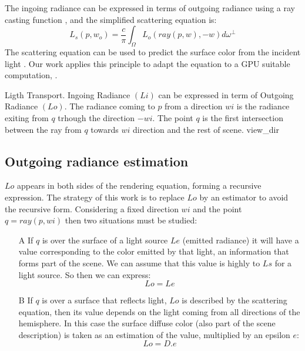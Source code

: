\documentclass[10pt, conference]{IEEEtran}
\begin{document}
The ingoing radiance can be expressed in terms of outgoing radiance using a ray casting function \cite{ray_casting_function}, and the simplified scattering equation is:
\[
	L_s(p,w_o) = \frac{c}{\pi }\int_ \Omega L_o(ray(p,w), -w)d\omega^\perp
\]
The scattering equation can be used to predict the surface color from the incident light \cite{scattering_equation}. 
Our work applies this principle to adapt the equation to a GPU suitable computation, .

\subimages
	{Ligth Transport. Ingoing Radiance $(Li)$ can be expressed in term of Outgoing Radiance $(Lo)$.
		The radiance coming to $p$ from a direction $wi$ is the radiance exiting from $q$ trhough the direction $-wi$. 
		The point $q$ is the first intersection between the ray from $q$ towards $wi$ direction and the rest of scene.}
	{view_dir}{
}

\subsection{Outgoing radiance estimation}
%
$Lo$ appears in both sides of the rendering equation, forming a recursive expression. The strategy of this work is to replace $Lo$ by an estimator to avoid the recursive form. 
Considering a fixed direction $wi$ and the point $q = ray(p, wi)$ then two situations must be studied:

\begin{itemize}
	\item[A] If $q$ is over the surface of a light source $Le$ (emitted radiance) it will have a value corresponding to the color emitted by that light, an information that forms part of the scene. We can assume that this value is highly to $Ls$ for a light source. So then we can express:
		\begin{equation}
			\label{eq_radiance_case_A}
			Lo = Le 
		\end{equation}
	\item[B] If $q$ is over a surface that reflects light, $Lo$ is described by the scattering equation, then its value depends on the light coming from all directions of the hemisphere. In this case the surface diffuse color (also part of the scene description) is taken as an estimation of the value, multiplied by an epsilon $e$:
		\begin{equation}
			\label{eq_radiance_case_B}
			Lo = D.e 
		\end{equation}
\end{itemize}
\end{document}
